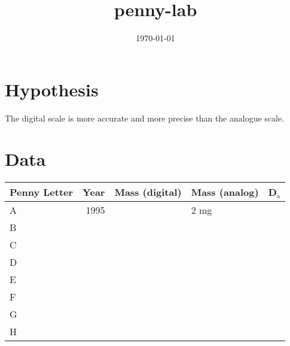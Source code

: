 \documentclass[11pt]{article}
\date{\today}
\title{penny-lab}
\begin{document}
\maketitle
\tableofcontents

\section{Hypothesis}
\label{sec-1}
The digital scale is more accurate and more precise than the
analogue scale.

\section{Data}
\label{sec-2}
\begin{center}
\begin{tabular}{lrlll}
\hline
Penny Letter & Year & Mass (digital) & Mass (analog) & D$_{\text{a}}$\\
\hline
A & 1995 &  & 2 mg & \\
\hline
B &  &  &  & \\
\hline
C &  &  &  & \\
\hline
D &  &  &  & \\
\hline
E &  &  &  & \\
\hline
F &  &  &  & \\
\hline
G &  &  &  & \\
\hline
H &  &  &  & \\
\hline
\end{tabular}
\end{center}
\end{document}
